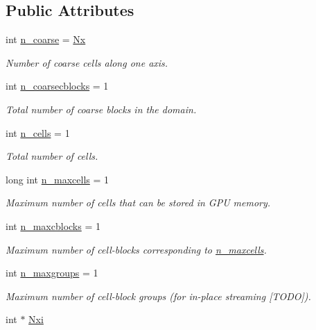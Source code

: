 \subsection*{Public Attributes}
\begin{DoxyCompactItemize}
\item 
int \hyperlink{classMesh_a4605f1f36e3e751c5cf7792afc1d941f}{n\+\_\+coarse} = \hyperlink{cppspec_8h_af093d941bc37a7a3f38e1db6593d9633}{Nx}
\begin{DoxyCompactList}\small\item\em Number of coarse cells along one axis. \end{DoxyCompactList}\item 
int \hyperlink{classMesh_a1a2bbc581d1542d2c5cdc273d509a89a}{n\+\_\+coarsecblocks} = 1
\begin{DoxyCompactList}\small\item\em Total number of coarse blocks in the domain. \end{DoxyCompactList}\item 
int \hyperlink{classMesh_afac537fd7ffc8ad618d55fe619b4a37e}{n\+\_\+cells} = 1
\begin{DoxyCompactList}\small\item\em Total number of cells. \end{DoxyCompactList}\item 
long int \hyperlink{classMesh_a106dbb299d9e9f754438d903846102df}{n\+\_\+maxcells} = 1
\begin{DoxyCompactList}\small\item\em Maximum number of cells that can be stored in G\+PU memory. \end{DoxyCompactList}\item 
int \hyperlink{classMesh_a06747b090209a57051f35bce181ffec0}{n\+\_\+maxcblocks} = 1
\begin{DoxyCompactList}\small\item\em Maximum number of cell-\/blocks corresponding to \hyperlink{classMesh_a106dbb299d9e9f754438d903846102df}{n\+\_\+maxcells}. \end{DoxyCompactList}\item 
int \hyperlink{classMesh_a4e7bfac668bee06cb6c5fe49d92ea29b}{n\+\_\+maxgroups} = 1
\begin{DoxyCompactList}\small\item\em Maximum number of cell-\/block groups (for in-\/place streaming \mbox{[}T\+O\+DO\mbox{]}). \end{DoxyCompactList}\item 
int $\ast$ \hyperlink{classMesh_a9f786ddddcfb54992075edb51784e9c8}{Nxi}

\end{DoxyCompactItemize}
